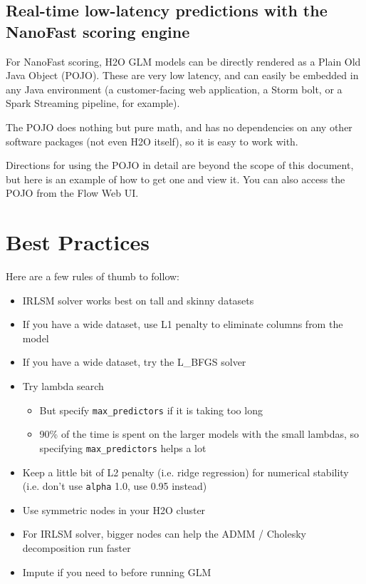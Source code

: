 \subsection{Real-time low-latency predictions with the NanoFast scoring engine}

For NanoFast scoring, H2O GLM models can be directly rendered as a Plain Old Java Object (POJO).  These are very
low latency, and can easily be embedded in any Java environment (a customer-facing web application, a Storm bolt,
or a Spark Streaming pipeline, for example).

The POJO does nothing but pure math, and has no dependencies on any other software packages (not even H2O itself),
so it is easy to work with.

Directions for using the POJO in detail are beyond the scope of this document, but here is an example of how to get
one and view it.  You can also access the POJO from the Flow Web UI.

\bigskip
\waterExampleInR




\section{Best Practices}

Here are a few rules of thumb to follow:

\begin{itemize}
\item IRLSM solver works best on tall and skinny datasets
\item If you have a wide dataset, use L1 penalty to eliminate columns from the model
\item If you have a wide dataset, try the L\_BFGS solver
\item Try lambda search
      \begin{itemize}
      \item But specify \texttt{max\_predictors} if it is taking too long
      \item 90\% of the time is spent on the larger models with the small lambdas, so specifying \texttt{max\_predictors} helps a lot
      \end{itemize}
\item Keep a little bit of L2 penalty (i.e. ridge regression) for numerical stability (i.e. don’t use \texttt{alpha} 1.0, use 0.95 instead)
\item Use symmetric nodes in your H2O cluster
\item For IRLSM solver, bigger nodes can help the ADMM / Cholesky decomposition run faster
\item Impute if you need to before running GLM
\end{itemize}

